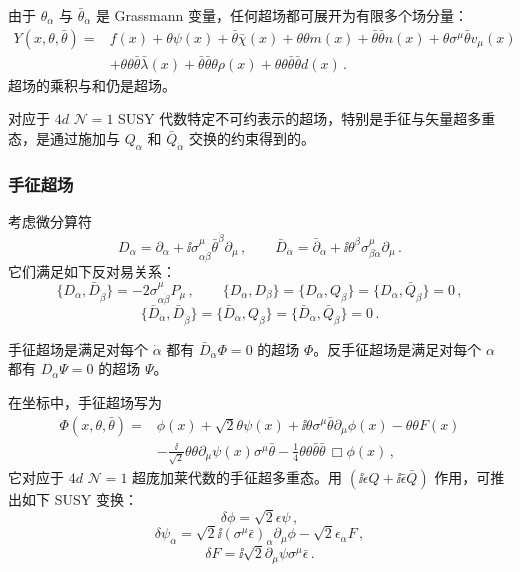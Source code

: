 由于 $\theta_\alpha$ 与 $\bar\theta_{\dot\alpha}$ 是 Grassmann 变量，任何超场都可展开为有限多个场分量：
\[
\begin{aligned}
Y(x,\theta,\bar\theta)={}&f(x)+\theta\psi(x)+\bar\theta\bar\chi(x)+\theta\theta m(x)+\bar\theta\bar\theta n(x)+\theta\sigma^\mu\bar\theta v_\mu(x)\\
&+\theta\theta\bar\theta\bar\lambda(x)+\bar\theta\bar\theta\theta\rho(x)+\theta\theta\bar\theta\bar\theta d(x)\,.
\end{aligned}
\]
超场的乘积与和仍是超场。

对应于 $4d$ $\mathcal{N}=1$ SUSY 代数特定不可约表示的超场，特别是手征与矢量超多重态，是通过施加与 $Q_\alpha$ 和 $\bar Q_{\dot\alpha}$ 交换的约束得到的。

\subsubsection*{手征超场}

考虑微分算符
\begin{equation}
D_\alpha=\partial_\alpha+\ii\sigma^\mu_{\alpha\dot\beta}\bar\theta^{\dot\beta}\partial_\mu\,,\qquad
\bar D_{\dot\alpha}=\bar\partial_{\dot\alpha}+\ii\theta^\beta\sigma^\mu_{\beta\dot\alpha}\partial_\mu\,.
\tag{17.8}
\end{equation}
它们满足如下反对易关系：
\[
\{D_\alpha,\bar D_{\dot\beta}\}=-2\sigma^\mu_{\alpha\dot\beta}P_\mu\,,\qquad
\{D_\alpha,D_\beta\}=\{D_\alpha,Q_\beta\}=\{D_\alpha,\bar Q_\beta\}=0\,,
\]
\[
\{\bar D_{\dot\alpha},\bar D_{\dot\beta}\}=\{\bar D_{\dot\alpha},Q_\beta\}=\{\bar D_{\dot\alpha},\bar Q_\beta\}=0\,.
\]

\begin{definition}[17.17] 手征超场是满足对每个 $\dot\alpha$ 都有 $\bar D_{\dot\alpha}\Phi=0$ 的超场 $\Phi$。反手征超场是满足对每个 $\alpha$ 都有 $D_\alpha\Psi=0$ 的超场 $\Psi$。\end{definition}

在坐标中，手征超场写为
\begin{equation}
\begin{aligned}
\Phi(x,\theta,\bar\theta)={}&\phi(x)+\sqrt{2}\theta\psi(x)+\ii\theta\sigma^\mu\bar\theta\partial_\mu\phi(x)-\theta\theta F(x)\\
&-\frac{\ii}{\sqrt{2}}\theta\theta\partial_\mu\psi(x)\sigma^\mu\bar\theta-\frac{1}{4}\theta\theta\bar\theta\bar\theta\,\Box\phi(x)\,,
\end{aligned}
\tag{17.9}
\end{equation}
它对应于 $4d$ $\mathcal{N}=1$ 超庞加莱代数的手征超多重态。用 $(\ii\epsilon Q+\ii\bar\epsilon\bar Q)$ 作用，可推出如下 SUSY 变换：
\[
\delta\phi=\sqrt{2}\epsilon\psi\,,
\]
\[
\delta\psi_\alpha=\sqrt{2}\ii(\sigma^\mu\bar\epsilon)_\alpha\partial_\mu\phi-\sqrt{2}\epsilon_\alpha F\,,
\]
\[
\delta F=\ii\sqrt{2}\partial_\mu\psi\sigma^\mu\bar\epsilon\,.
\]

